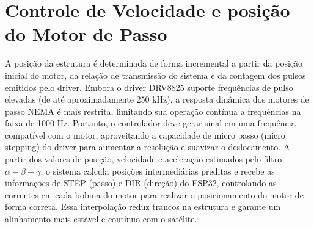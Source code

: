 \section{Controle de Velocidade e posição do Motor de Passo}\label{sec:controle_motor_passo}
A posição da estrutura é determinada de forma incremental a partir da posição inicial do motor, da relação de transmissão do sistema e da contagem dos pulsos emitidos pelo driver.
Embora o driver DRV8825 suporte frequências de pulso elevadas (de até aproximadamente 250 kHz), a resposta dinâmica dos motores de passo NEMA é mais restrita, limitando sua operação contínua a frequências na faixa de 1000 Hz.
Portanto, o controlador deve gerar sinal em uma frequência compatível com o motor, aproveitando a capacidade de micro passo (micro stepping) do driver para aumentar a resolução e suavizar o deslocamento.
A partir dos valores de posição, velocidade e aceleração estimados pelo filtro $\alpha-\beta-\gamma$, o sistema calcula posições intermediárias preditas e recebe as informações de STEP (passo) e DIR (direção) do ESP32, controlando as correntes em cada bobina do motor para realizar o posicionamento do motor de forma correta.
Essa interpolação reduz trancos na estrutura e garante um alinhamento mais estável e contínuo com o satélite.
